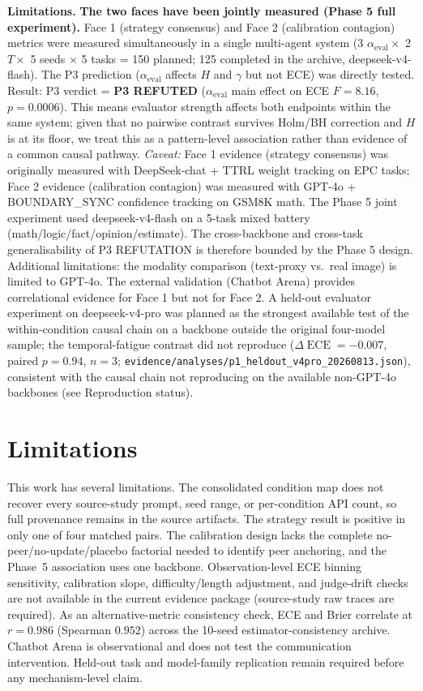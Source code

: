 \documentclass[11pt]{article}
\DeclareMathOperator{\ECE}{ECE}
\begin{document}
\textbf{Limitations.} \textbf{The two faces have been jointly measured (Phase 5 full experiment).} Face 1 (strategy consensus) and Face 2 (calibration contagion) metrics were measured simultaneously in a single multi-agent system (3 $\alpha_{\text{eval}} \times$ 2 $T \times$ 5 seeds $\times$ 5 tasks = 150 planned; 125 completed in the archive, deepseek-v4-flash). The P3 prediction ($\alpha_{\text{eval}}$ affects $H$ and $\gamma$ but not ECE) was directly tested. Result: P3 verdict = \textbf{P3 REFUTED} ($\alpha_{\text{eval}}$ main effect on ECE $F = 8.16$, $p = 0.0006$). This means evaluator strength affects both endpoints within the same system; given that no pairwise contrast survives Holm/BH correction and $H$ is at its floor, we treat this as a pattern-level association rather than evidence of a common causal pathway. \emph{Caveat:} Face 1 evidence (strategy consensus) was originally measured with DeepSeek-chat + TTRL weight tracking on EPC tasks; Face 2 evidence (calibration contagion) was measured with GPT-4o + BOUNDARY\_SYNC confidence tracking on GSM8K math. The Phase 5 joint experiment used deepseek-v4-flash on a 5-task mixed battery (math/logic/fact/opinion/estimate). The cross-backbone and cross-task generalisability of P3 REFUTATION is therefore bounded by the Phase 5 design. Additional limitations: the modality comparison (text-proxy vs.\ real image) is limited to GPT-4o. The external validation (Chatbot Arena) provides correlational evidence for Face 1 but not for Face 2. A held-out evaluator experiment on deepseek-v4-pro was planned as the strongest available test of the within-condition causal chain on a backbone outside the original four-model sample; the temporal-fatigue contrast did not reproduce ($\Delta\ECE = -0.007$, paired $p = 0.94$, $n = 3$; \texttt{evidence/analyses/p1\_heldout\_v4pro\_20260813.json}), consistent with the causal chain not reproducing on the available non-GPT-4o backbones (see Reproduction status).

\section{Limitations}
This work has several limitations. The consolidated condition map does not recover every source-study prompt, seed range, or per-condition API count, so full provenance remains in the source artifacts. The strategy result is positive in only one of four matched pairs. The calibration design lacks the complete no-peer/no-update/placebo factorial needed to identify peer anchoring, and the Phase~5 association uses one backbone. Observation-level ECE binning sensitivity, calibration slope, difficulty/length adjustment, and judge-drift checks are not available in the current evidence package (source-study raw traces are required). As an alternative-metric consistency check, ECE and Brier correlate at $r = 0.986$ (Spearman $0.952$) across the 10-seed estimator-consistency archive. Chatbot Arena is observational and does not test the communication intervention. Held-out task and model-family replication remain required before any mechanism-level claim.
\end{document}
